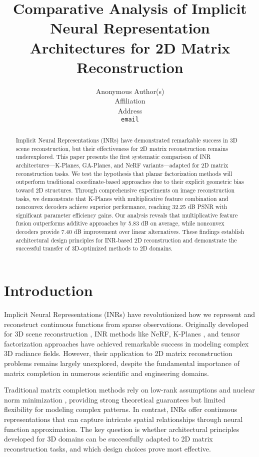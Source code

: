 \documentclass{article}
\title{Comparative Analysis of Implicit Neural Representation Architectures for 2D Matrix Reconstruction}
\author{
  Anonymous Author(s) \\
  Affiliation \\
  Address \\
  \texttt{email}
}
\begin{document}
\maketitle

\begin{abstract}
Implicit Neural Representations (INRs) have demonstrated remarkable success in 3D scene reconstruction, but their effectiveness for 2D matrix reconstruction remains underexplored. This paper presents the first systematic comparison of INR architectures—K-Planes, GA-Planes, and NeRF variants—adapted for 2D matrix reconstruction tasks. We test the hypothesis that planar factorization methods will outperform traditional coordinate-based approaches due to their explicit geometric bias toward 2D structures. Through comprehensive experiments on image reconstruction tasks, we demonstrate that K-Planes with multiplicative feature combination and nonconvex decoders achieve superior performance, reaching 32.25 dB PSNR with significant parameter efficiency gains. Our analysis reveals that multiplicative feature fusion outperforms additive approaches by 5.83 dB on average, while nonconvex decoders provide 7.40 dB improvement over linear alternatives. These findings establish architectural design principles for INR-based 2D reconstruction and demonstrate the successful transfer of 3D-optimized methods to 2D domains.
\end{abstract}

\section{Introduction}

Implicit Neural Representations (INRs) have revolutionized how we represent and reconstruct continuous functions from sparse observations. Originally developed for 3D scene reconstruction \cite{mildenhall2020nerf}, INR methods like NeRF, K-Planes \cite{fridovich2023kplanes}, and tensor factorization approaches \cite{chen2022tensorf} have achieved remarkable success in modeling complex 3D radiance fields. However, their application to 2D matrix reconstruction problems remains largely unexplored, despite the fundamental importance of matrix completion in numerous scientific and engineering domains.

Traditional matrix completion methods rely on low-rank assumptions and nuclear norm minimization \cite{candes2009matrix,recht2011simpler}, providing strong theoretical guarantees but limited flexibility for modeling complex patterns. In contrast, INRs offer continuous representations that can capture intricate spatial relationships through neural function approximation. The key question is whether architectural principles developed for 3D domains can be successfully adapted to 2D matrix reconstruction tasks, and which design choices prove most effective.
\end{document}
